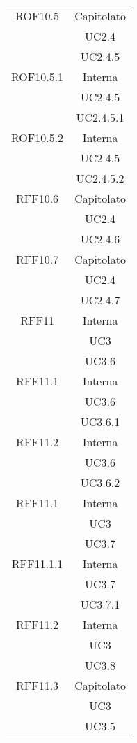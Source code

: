\begin{longtable}{|c|c|}
\midrule
ROF10.5
& Capitolato\\
& UC2.4\\
& UC2.4.5
\\

\midrule
ROF10.5.1
& Interna\\
& UC2.4.5\\
& UC2.4.5.1
\\

\midrule
ROF10.5.2
& Interna\\
& UC2.4.5\\
& UC2.4.5.2
\\

\midrule
RFF10.6
& Capitolato\\
& UC2.4\\
& UC2.4.6
\\

\midrule
RFF10.7
& Capitolato\\
& UC2.4\\
& UC2.4.7
\\



\midrule
RFF11
& Interna\\
& UC3\\
& UC3.6\\

\midrule
RFF11.1
& Interna\\
& UC3.6\\
& UC3.6.1\\

\midrule
RFF11.2
& Interna\\
& UC3.6\\
& UC3.6.2\\

\midrule
RFF11.1
& Interna\\
& UC3\\
& UC3.7\\

\midrule
RFF11.1.1
& Interna\\
& UC3.7\\
& UC3.7.1\\

\midrule
RFF11.2
& Interna\\
& UC3\\
& UC3.8\\

\midrule
RFF11.3
& Capitolato\\
& UC3\\
& UC3.5\\


\end{longtable}
